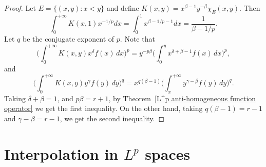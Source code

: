 \begin{proof}
Let $E=\{(x,y):x<y\}$ and define $K(x,y)=x^{\beta-1}y^{-\beta}\chi_E(x,y)$. Then
\[\int_{0}^{+\infty}K(x,1)x^{-1/p}dx=\int_{0}^{1}x^{\beta-1/p-1}dx=\frac{1}{\beta-1/p}.\]
Let $q$ be the conjugate exponent of $p$. Note that
\[\Big(\int_{0}^{+\infty}K(x,y)x^\delta f(x)\,dx\Big)^p=y^{-p\beta}\Big(\int_{0}^{y}x^{\delta+\beta-1}f(x)\,dx\Big)^p,\]
and
\[\Big(\int_{0}^{+\infty}K(x,y)y^\gamma f(y)\,dy\Big)^{q}=x^{q(\beta-1)}\Big(\int_{x}^{+\infty}y^{\gamma-\beta}f(y)\,dy\Big)^{q}.\]
Taking $\delta+\beta=1$, and $p\beta=r+1$, by Theorem~\ref{L^p anti-homogeneous function operator} we get the first inequality. On the other hand, taking $q(\beta-1)=r-1$ and $\gamma-\beta=r-1$, we get the second inequality.
\end{proof}
\newpage
\chapter{Interpolation in \boldmath$L^p$ spaces}
